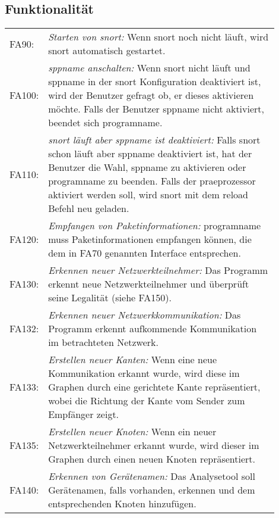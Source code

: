 \subsection{Funktionalität}

\begin{longtable}{lp{0.9\linewidth}}

FA90: & \textit{Starten von \gls{snort}: }Wenn \gls{snort} noch nicht läuft, wird \gls{snort} automatisch gestartet. \\

FA100: & \textit{\gls{sppname} anschalten: }Wenn \gls{snort} nicht läuft und \gls{sppname} in der \gls{snort} Konfiguration deaktiviert ist, wird der Benutzer gefragt ob, er dieses aktivieren möchte. Falls der Benutzer \gls{sppname} nicht aktiviert, beendet sich \gls{programname}. \\

FA110: & \textit{\gls{snort} läuft aber \gls{sppname} ist deaktiviert: }Falls \gls{snort} schon läuft aber \gls{sppname} deaktiviert ist, hat der Benutzer die Wahl, \gls{sppname} zu aktivieren oder \gls{programname} zu beenden. Falls der \gls{praeprozessor} aktiviert werden soll, wird \gls{snort} mit dem reload Befehl neu geladen. \\

FA120: & \textit{Empfangen von Paketinformationen: }\gls{programname} muss Paketinformationen empfangen können, die dem in FA70 genannten Interface entsprechen. \\

FA130: & \textit{Erkennen neuer Netzwerkteilnehmer: }Das Programm erkennt neue Netzwerkteilnehmer und überprüft seine Legalität (siehe FA150). \\

FA132: & \textit{Erkennen neuer Netzwerkkommunikation: }Das Programm erkennt aufkommende Kommunikation im betrachteten Netzwerk. \\

FA133: & \textit{Erstellen neuer Kanten: }Wenn eine neue Kommunikation erkannt wurde, wird diese im Graphen durch eine gerichtete Kante repräsentiert, wobei die Richtung der Kante vom Sender zum Empfänger zeigt. \\

FA135: & \textit{Erstellen neuer Knoten: }Wenn ein neuer Netzwerkteilnehmer erkannt wurde, wird dieser im Graphen durch einen neuen Knoten repräsentiert. \\

FA140: & \textit{Erkennen von Gerätenamen: }Das Analysetool soll Gerätenamen, falls vorhanden, erkennen und dem entsprechenden Knoten hinzufügen. \\


\end{longtable}
